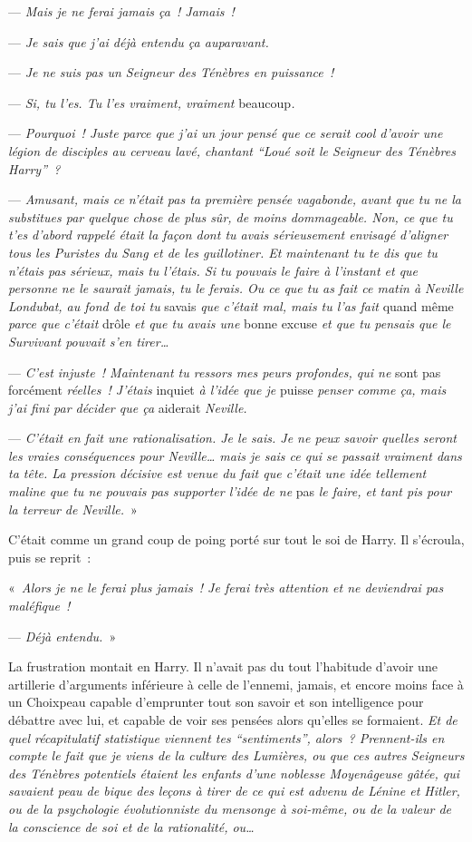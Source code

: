 --- \emph{Mais je ne ferai jamais ça~! Jamais~!}

--- \emph{Je sais que j'ai déjà entendu ça auparavant.}

--- \emph{Je ne suis pas un Seigneur des Ténèbres en puissance~!}

--- \emph{Si, tu l'es. Tu l'es vraiment, vraiment} beaucoup\emph{.}

--- \emph{Pourquoi~! Juste parce que j'ai un jour pensé que ce serait cool d'avoir une légion de disciples au cerveau lavé, chantant “Loué soit le Seigneur des Ténèbres Harry”~?}

--- \emph{Amusant, mais ce n'était pas ta première pensée vagabonde, avant que tu ne la substitues par quelque chose de plus sûr, de moins dommageable. Non, ce que tu t'es d'abord rappelé était la façon dont tu avais sérieusement envisagé d'aligner tous les Puristes du Sang et de les guillotiner. Et maintenant tu te dis que tu n'étais pas sérieux, mais tu l'étais. Si tu pouvais le faire à l'instant et que personne ne le saurait jamais, tu le ferais. Ou ce que tu as fait ce matin à Neville Londubat, au fond de toi tu} savais \emph{que c'était mal, mais tu l'as fait} quand même \emph{parce que c'était} drôle \emph{et que tu avais une} bonne excuse \emph{et que tu pensais que le Survivant pouvait s'en tirer…}

--- \emph{C'est injuste~! Maintenant tu ressors mes peurs profondes, qui ne} sont pas forcément \emph{réelles~! J'étais} inquiet \emph{à l'idée que je} puisse \emph{penser comme ça, mais j'ai fini par décider que ça} aiderait \emph{Neville.}

--- \emph{C'était en fait une rationalisation. Je le sais. Je ne peux savoir quelles seront les vraies conséquences pour Neville… mais je sais ce qui se passait vraiment dans ta tête. La pression décisive est venue du fait que c'était une idée tellement maline que tu ne pouvais pas supporter l'idée de ne} pas \emph{le faire, et tant pis pour la terreur de Neville.}~»

C'était comme un grand coup de poing porté sur tout le soi de Harry. Il s'écroula, puis se reprit~:

«~\emph{Alors je ne le ferai plus jamais~! Je ferai très attention et ne deviendrai pas maléfique~!}

--- \emph{Déjà entendu.}~»

La frustration montait en Harry. Il n'avait pas du tout l'habitude d'avoir une artillerie d'arguments inférieure à celle de l'ennemi, jamais, et encore moins face à un Choixpeau capable d'emprunter tout son savoir et son intelligence pour débattre avec lui, et capable de voir ses pensées alors qu'elles se formaient. \emph{Et de quel récapitulatif statistique viennent tes “sentiments”, alors~? Prennent-ils en compte le fait que je viens de la culture des Lumières, ou que ces autres Seigneurs des Ténèbres potentiels étaient les enfants d'une noblesse Moyenâgeuse gâtée, qui savaient peau de bique des leçons à tirer de ce qui est advenu de Lénine et Hitler, ou de la psychologie évolutionniste du mensonge à soi-même, ou de la valeur de la conscience de soi et de la rationalité, ou…}

